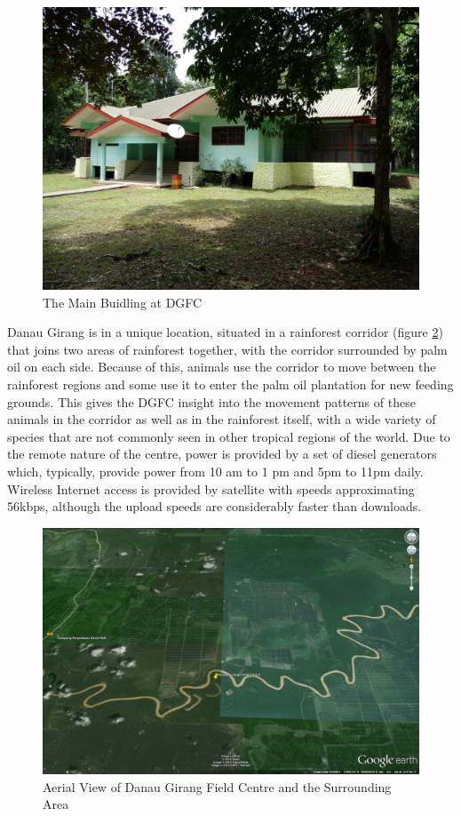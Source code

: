 		\begin{figure}[h]
		\centering
		\includegraphics[width=\textwidth]{Chap3/figures/field_centre}
		\caption{The Main Buidling at DGFC}
		\label{tech:fig:map}
		\end{figure}

Danau Girang is in a unique location, situated in a rainforest corridor (figure \ref{tech:fig:map}) that joins two areas of rainforest together, with the corridor surrounded by palm oil on each side. Because of this, animals use the corridor to move between the rainforest regions and some use it to enter the palm oil plantation for new feeding grounds. This gives the DGFC insight into the movement patterns of these animals in the corridor as well as in the rainforest itself, with a wide variety of species that are not commonly seen in other tropical regions of the world. Due to the remote nature of the centre, power is provided by a set of diesel generators which, typically, provide power from 10 am to 1 pm and 5pm to 11pm daily. Wireless Internet access is provided by satellite with speeds approximating 56kbps, although the upload speeds are considerably faster than downloads.

		\begin{figure}[h]
		\centering
		\includegraphics[width=\textwidth]{Chap3/figures/dgmap}
		\caption{Aerial View of Danau Girang Field Centre and the Surrounding Area}
		\label{tech:fig:map}
		\end{figure}

